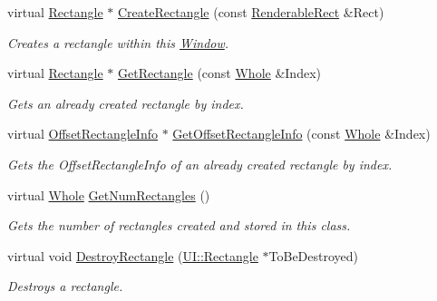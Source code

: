\begin{DoxyCompactItemize}
virtual \hyperlink{classphys_1_1UI_1_1Rectangle}{Rectangle} $\ast$ \hyperlink{classphys_1_1UI_1_1Window_a6388ff0085a5bf40942c4b21b1b0e141}{CreateRectangle} (const \hyperlink{structphys_1_1UI_1_1RenderableRect}{RenderableRect} \&Rect)
\begin{DoxyCompactList}\small\item\em Creates a rectangle within this \hyperlink{classphys_1_1UI_1_1Window}{Window}. \item\end{DoxyCompactList}\item 
virtual \hyperlink{classphys_1_1UI_1_1Rectangle}{Rectangle} $\ast$ \hyperlink{classphys_1_1UI_1_1Window_a522a0af5999c8fae7009e09752b1a430}{GetRectangle} (const \hyperlink{namespacephys_a460f6bc24c8dd347b05e0366ae34f34a}{Whole} \&Index)
\begin{DoxyCompactList}\small\item\em Gets an already created rectangle by index. \item\end{DoxyCompactList}\item 
virtual \hyperlink{structphys_1_1UI_1_1ResizingInfo}{OffsetRectangleInfo} $\ast$ \hyperlink{classphys_1_1UI_1_1Window_ae8593fa6cd22ed15dd0b0daf9dcb69d3}{GetOffsetRectangleInfo} (const \hyperlink{namespacephys_a460f6bc24c8dd347b05e0366ae34f34a}{Whole} \&Index)
\begin{DoxyCompactList}\small\item\em Gets the OffsetRectangleInfo of an already created rectangle by index. \item\end{DoxyCompactList}\item 
virtual \hyperlink{namespacephys_a460f6bc24c8dd347b05e0366ae34f34a}{Whole} \hyperlink{classphys_1_1UI_1_1Window_a4d2d8821df32a920e7389b37f50f7c6d}{GetNumRectangles} ()
\begin{DoxyCompactList}\small\item\em Gets the number of rectangles created and stored in this class. \item\end{DoxyCompactList}\item 
virtual void \hyperlink{classphys_1_1UI_1_1Window_ab66c4c1d5f26e3f4fcdd34063b711365}{DestroyRectangle} (\hyperlink{classphys_1_1UI_1_1Rectangle}{UI::Rectangle} $\ast$ToBeDestroyed)
\begin{DoxyCompactList}\small\item\em Destroys a rectangle. \item\end{DoxyCompactList}\item 

\end{DoxyCompactItemize}
